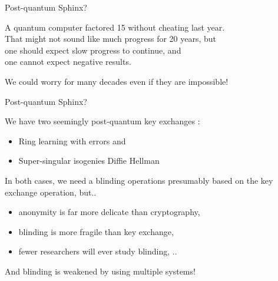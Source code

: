 \documentclass[fleqn,xcolor={usenames,dvipsnames}]{beamer}
\begin{document}




\begin{frame}{Post-quantum Sphinx?}

A quantum computer factored 15 without cheating last year. \\
That might not sound like much progress for 20 years, but \\
\hspace*{3pt}  one should expect slow progress to continue, and \\
\hspace*{3pt}  one cannot expect negative results. \\

\medskip

We could worry for many decades even if they are impossible!

\end{frame}


\begin{frame}{Post-quantum Sphinx?}

We have two seemingly post-quantum key exchanges :
\begin{itemize}
\item Ring learning with errors and
\item Super-singular isogenies Diffie Hellman 
\end{itemize}

\medskip
In both cases, we need a blinding operations presumably based on
 the key exchange operation, but..
\begin{itemize}
\item anonymity is far more delicate than cryptography,
\item blinding is more fragile than key exchange, 
\item fewer researchers will ever study blinding, ..
\end{itemize}

\smallskip

And blinding is weakened by using multiple systems!

\end{frame}
\end{document}
